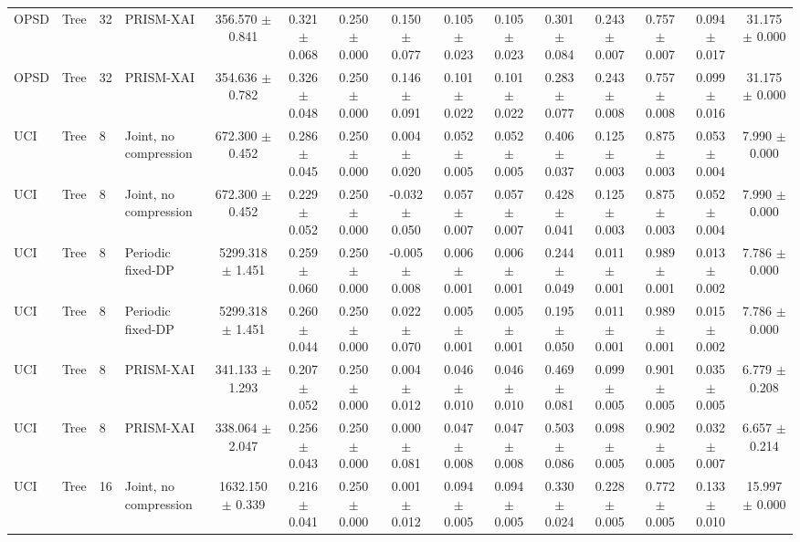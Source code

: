 \begin{table}[t]
\begin{tabular}{llllccccccccccc}
OPSD & Tree & 32 & PRISM-XAI & 356.570 $\pm$ 0.841 & 0.321 $\pm$ 0.068 & 0.250 $\pm$ 0.000 & 0.150 $\pm$ 0.077 & 0.105 $\pm$ 0.023 & 0.105 $\pm$ 0.023 & 0.301 $\pm$ 0.084 & 0.243 $\pm$ 0.007 & 0.757 $\pm$ 0.007 & 0.094 $\pm$ 0.017 & 31.175 $\pm$ 0.000 \\
OPSD & Tree & 32 & PRISM-XAI & 354.636 $\pm$ 0.782 & 0.326 $\pm$ 0.048 & 0.250 $\pm$ 0.000 & 0.146 $\pm$ 0.091 & 0.101 $\pm$ 0.022 & 0.101 $\pm$ 0.022 & 0.283 $\pm$ 0.077 & 0.243 $\pm$ 0.008 & 0.757 $\pm$ 0.008 & 0.099 $\pm$ 0.016 & 31.175 $\pm$ 0.000 \\
UCI & Tree & 8 & Joint, no compression & 672.300 $\pm$ 0.452 & 0.286 $\pm$ 0.045 & 0.250 $\pm$ 0.000 & 0.004 $\pm$ 0.020 & 0.052 $\pm$ 0.005 & 0.052 $\pm$ 0.005 & 0.406 $\pm$ 0.037 & 0.125 $\pm$ 0.003 & 0.875 $\pm$ 0.003 & 0.053 $\pm$ 0.004 & 7.990 $\pm$ 0.000 \\
UCI & Tree & 8 & Joint, no compression & 672.300 $\pm$ 0.452 & 0.229 $\pm$ 0.052 & 0.250 $\pm$ 0.000 & -0.032 $\pm$ 0.050 & 0.057 $\pm$ 0.007 & 0.057 $\pm$ 0.007 & 0.428 $\pm$ 0.041 & 0.125 $\pm$ 0.003 & 0.875 $\pm$ 0.003 & 0.052 $\pm$ 0.004 & 7.990 $\pm$ 0.000 \\
UCI & Tree & 8 & Periodic fixed-DP & 5299.318 $\pm$ 1.451 & 0.259 $\pm$ 0.060 & 0.250 $\pm$ 0.000 & -0.005 $\pm$ 0.008 & 0.006 $\pm$ 0.001 & 0.006 $\pm$ 0.001 & 0.244 $\pm$ 0.049 & 0.011 $\pm$ 0.001 & 0.989 $\pm$ 0.001 & 0.013 $\pm$ 0.002 & 7.786 $\pm$ 0.000 \\
UCI & Tree & 8 & Periodic fixed-DP & 5299.318 $\pm$ 1.451 & 0.260 $\pm$ 0.044 & 0.250 $\pm$ 0.000 & 0.022 $\pm$ 0.070 & 0.005 $\pm$ 0.001 & 0.005 $\pm$ 0.001 & 0.195 $\pm$ 0.050 & 0.011 $\pm$ 0.001 & 0.989 $\pm$ 0.001 & 0.015 $\pm$ 0.002 & 7.786 $\pm$ 0.000 \\
UCI & Tree & 8 & PRISM-XAI & 341.133 $\pm$ 1.293 & 0.207 $\pm$ 0.052 & 0.250 $\pm$ 0.000 & 0.004 $\pm$ 0.012 & 0.046 $\pm$ 0.010 & 0.046 $\pm$ 0.010 & 0.469 $\pm$ 0.081 & 0.099 $\pm$ 0.005 & 0.901 $\pm$ 0.005 & 0.035 $\pm$ 0.005 & 6.779 $\pm$ 0.208 \\
UCI & Tree & 8 & PRISM-XAI & 338.064 $\pm$ 2.047 & 0.256 $\pm$ 0.043 & 0.250 $\pm$ 0.000 & 0.000 $\pm$ 0.081 & 0.047 $\pm$ 0.008 & 0.047 $\pm$ 0.008 & 0.503 $\pm$ 0.086 & 0.098 $\pm$ 0.005 & 0.902 $\pm$ 0.005 & 0.032 $\pm$ 0.007 & 6.657 $\pm$ 0.214 \\
UCI & Tree & 16 & Joint, no compression & 1632.150 $\pm$ 0.339 & 0.216 $\pm$ 0.041 & 0.250 $\pm$ 0.000 & 0.001 $\pm$ 0.012 & 0.094 $\pm$ 0.005 & 0.094 $\pm$ 0.005 & 0.330 $\pm$ 0.024 & 0.228 $\pm$ 0.005 & 0.772 $\pm$ 0.005 & 0.133 $\pm$ 0.010 & 15.997 $\pm$ 0.000 \\

\end{tabular}
\end{table}
